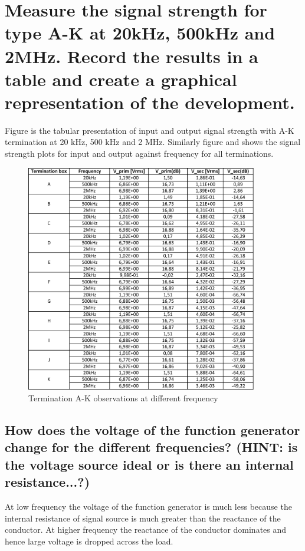 \documentclass[12pt,a4paper,UKenglish]{article}
\begin{document}
\section{Measure the signal strength for type A-K at 20kHz, 500kHz and 2MHz. Record the results in a table and create a graphical representation of the development.}
Figure is the tabular presentation of input and output signal strength with A-K termination at 20 kHz, 500 kHz and 2 MHz. Similarly figure and shows the signal strength plots for input and output against frequency for all terminations. 
\begin{figure} [H] %
  \centering 
  \includegraphics[width=0.9\textwidth]{img/task8_data.pdf} 
  \caption{Termination A-K observations at different frequency}
  \label{fig:task8} 
\end{figure}

\subsection{How does the voltage of the function generator change for the different frequencies? (HINT: is the voltage source ideal or is there an internal resistance...?)} 
At low frequency the voltage of the function generator is much less because the internal resistance of signal source is much greater than the reactance of the conductor. At higher frequency the reactance of the conductor dominates and hence large voltage is dropped across the load.
\end{document}
